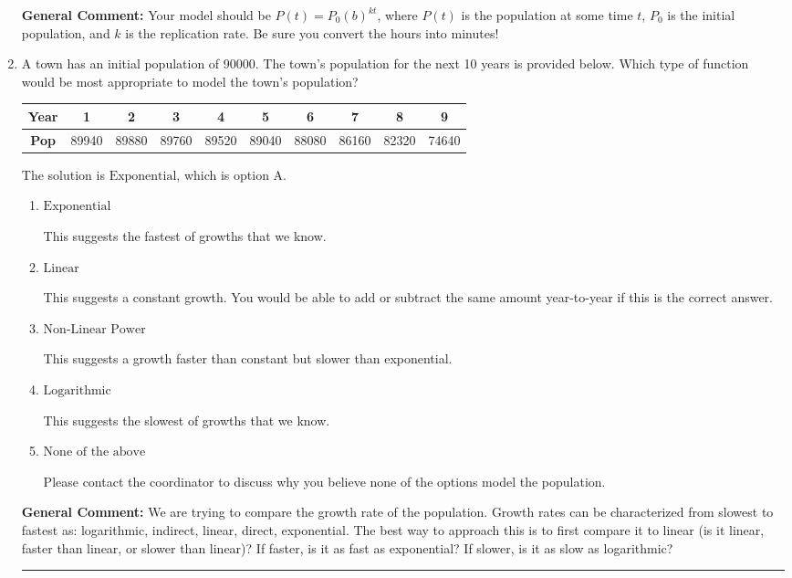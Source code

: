 \documentclass{extbook}[14pt]
\newcommand{\litem}[1]{\item #1

\rule{\textwidth}{0.4pt}}
\begin{document}
\begin{enumerate}
{\textbf{General Comment:} Your model should be $P(t) = P_0(b)^{kt}$, where $P(t)$ is the population at some time $t$, $P_0$ is the initial population, and $k$ is the replication rate. Be sure you convert the hours into minutes!
}
\litem{
A town has an initial population of 90000. The town's population for the next 10 years is provided below. Which type of function would be most appropriate to model the town's population?


\begin{tabular}{c|c|c|c|c|c|c|c|c|c}
\textbf{Year} &1 &2 &3 &4 &5 &6 &7 &8 &9\tabularnewline \hline
\textbf{Pop} &89940 &89880 &89760 &89520 &89040 &88080 &86160 &82320 &74640\end{tabular}The solution is \( \text{Exponential} \), which is option A.\begin{enumerate}[label=\Alph*.]
\item \( \text{Exponential} \)

This suggests the fastest of growths that we know.
\item \( \text{Linear} \)

This suggests a constant growth. You would be able to add or subtract the same amount year-to-year if this is the correct answer.
\item \( \text{Non-Linear Power} \)

This suggests a growth faster than constant but slower than exponential.
\item \( \text{Logarithmic} \)

This suggests the slowest of growths that we know.
\item \( \text{None of the above} \)

Please contact the coordinator to discuss why you believe none of the options model the population.
\end{enumerate}

\textbf{General Comment:} We are trying to compare the growth rate of the population. Growth rates can be characterized from slowest to fastest as: logarithmic, indirect, linear, direct, exponential. The best way to approach this is to first compare it to linear (is it linear, faster than linear, or slower than linear)? If faster, is it as fast as exponential? If slower, is it as slow as logarithmic?
}
\end{enumerate}
\end{document}
